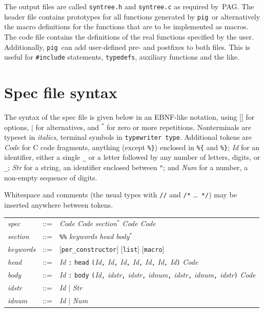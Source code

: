 \documentclass[a4paper,12pt]{article}
\def\pig{{\tt pig}}
\begin{document}
The output files are called \verb+syntree.h+ and \verb+syntree.c+
as required by~PAG. The header file contains prototypes for all
functions generated by \pig\ or alternatively the macro definitions
for the functions that are to be implemented as macros. The code
file contains the definitions of the real functions specified by the
user. Additionally, \pig\ can add user-defined pre- and postfixes to
both files. This is useful for \verb+#include+ statements,
\verb+typedefs+, auxiliary functions and the like.

\section{Spec file syntax}

The syntax of the spec file is given below in an EBNF-like notation,
using [] for options, \(|\) for alternatives, and \(^*\) for zero or
more repetitions. Nonterminals are typeset in {\em italics},
terminal symbols in {\tt typewriter type}. Additional tokens are
{\em Code} for C code fragments, anything (except \verb+%}+)
enclosed in \verb+%{+ and \verb+%}+; {\em Id} for an identifier,
either a single \verb+_+ or a letter followed by any number of
letters, digits, or \verb+_+; {\em Str} for a string, an identifier
enclosed between \verb+"+; and {\em Num} for a number, a non-empty
sequence of digits.

Whitespace and comments (the usual types with \verb+//+ and
\verb+/*+ \ldots\ \verb+*/+) may be inserted anywhere between
tokens.

\begin{center}
\begin{tabular}{l c l}
{\em spec}     & ::= & {\em Code Code section\(^*\) Code Code} \\
{\em section}  & ::= & \verb+%%+ {\em keywords head body\(^*\)} \\
{\em keywords} & ::= & [\verb+per_constructor+] [\verb+list+] [\verb+macro+] \\
{\em head}     & ::= & {\em Id} \verb+:+ \verb+head+ \verb+(+{\em Id}\verb+,+
        {\em Id}\verb+,+ {\em Id}\verb+,+ {\em Id}\verb+,+ {\em
        Id}\verb+,+ {\em Id}\verb+,+ {\em Id}\verb+)+ {\em Code} \\
{\em body}     & ::= & {\em Id} \verb+:+ \verb+body+ \verb+(+{\em Id}\verb+,+
        {\em idstr}\verb+,+ {\em idstr}\verb+,+ {\em idnum}\verb+,+
        {\em idstr}\verb+,+ {\em idnum}\verb+,+ {\em idstr}\verb+)+
        {\em Code} \\
{\em idstr}    & ::= & {\em Id} \(|\) {\em Str} \\
{\em idnum}    & ::= & {\em Id} \(|\) {\em Num} \\
\end{tabular}
\end{center}
\end{document}
